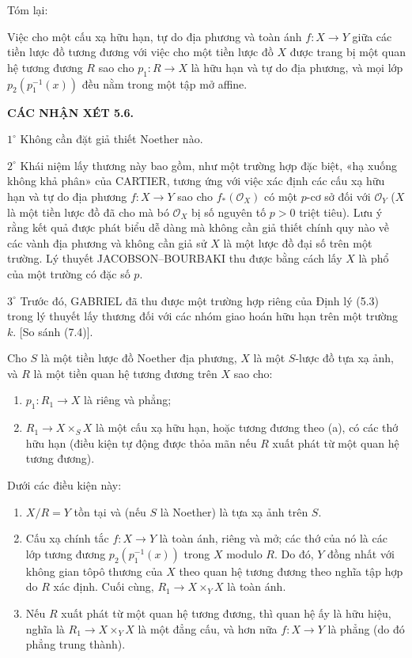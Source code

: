 Tóm lại:

 Việc cho một cấu xạ hữu hạn, tự do địa phương và toàn ánh
$f:X\to Y$ giữa các tiền lược đồ tương đương với việc cho một tiền lược đồ
$X$ được trang bị một quan hệ tương đương $R$ sao cho $p_1:R\to X$ là hữu hạn
và tự do địa phương, và mọi lớp $p_2(p_1^{-1}(x))$ đều nằm trong một tập mở
affine.

\medskip
\noindent\textbf{CÁC NHẬN XÉT 5.6.}

\smallskip
\noindent $1^\circ$ Không cần đặt giả thiết Noether nào.

\smallskip
\noindent $2^\circ$ Khái niệm lấy thương này bao gồm, như một trường hợp đặc
biệt, «hạ xuống không khả phân» của CARTIER, tương ứng với việc xác định các
cấu xạ hữu hạn và tự do địa phương $f:X\to Y$ sao cho
$f_*(\mathcal O_X)$ có một $p$-cơ sở đối với $\mathcal O_Y$ ($X$ là một tiền
lược đồ đã cho mà bó $\mathcal O_X$ bị số nguyên tố $p>0$ triệt tiêu). Lưu ý
rằng kết quả được phát biểu dễ dàng mà không cần giả thiết chính quy nào về
các vành địa phương và không cần giả sử $X$ là một lược đồ đại số trên một
trường. Lý thuyết JACOBSON--BOURBAKI thu được bằng cách lấy $X$ là phổ của
một trường có đặc số $p$.

\smallskip
\noindent $3^\circ$ Trước đó, GABRIEL đã thu được một trường hợp riêng của
Định lý (5.3) trong lý thuyết lấy thương đối với các nhóm giao hoán hữu hạn
trên một trường $k$. [So sánh (7.4)].


 Cho $S$ là một tiền lược đồ Noether địa phương, $X$ là
một $S$-lược đồ tựa xạ ảnh, và $R$ là một tiền quan hệ tương đương trên $X$
sao cho:
\begin{enumerate}
\item[(a)] $p_1:R_1\to X$ là riêng và phẳng;
\item[(b)] $R_1\to X\times_S X$ là một cấu xạ hữu hạn, hoặc tương đương theo
(a), có các thớ hữu hạn (điều kiện tự động được thỏa mãn nếu $R$ xuất phát từ
một quan hệ tương đương).
\end{enumerate}
Dưới các điều kiện này:
\begin{enumerate}
\item[(i)] $X/R=Y$ tồn tại và (nếu $S$ là Noether) là tựa xạ ảnh trên $S$.

\item[(ii)] Cấu xạ chính tắc $f:X\to Y$ là toàn ánh, riêng và mở; các thớ của
nó là các lớp tương đương $p_2(p_1^{-1}(x))$ trong $X$ modulo $R$. Do đó,
$Y$ đồng nhất với không gian tôpô thương của $X$ theo quan hệ tương đương theo
nghĩa tập hợp do $R$ xác định. Cuối cùng,
$R_1\to X\times_Y X$ là toàn ánh.

\item[(iii)] Nếu $R$ xuất phát từ một quan hệ tương đương, thì quan hệ ấy là
hữu hiệu, nghĩa là $R_1\to X\times_Y X$ là một đẳng cấu, và hơn nữa
$f:X\to Y$ là phẳng (do đó phẳng trung thành).
\end{enumerate}

